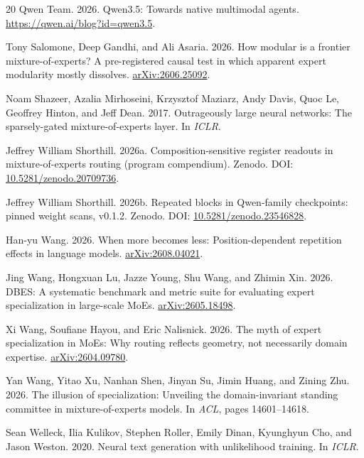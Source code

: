 \documentclass[10pt,a4paper,twocolumn]{article}
\begin{document}
\begin{thebibliography}{20}
Qwen Team. 2026. Qwen3.5: Towards native multimodal agents.
\url{https://qwen.ai/blog?id=qwen3.5}.

Tony Salomone, Deep Gandhi, and Ali Asaria. 2026. How modular is a frontier
mixture-of-experts? A pre-registered causal test in which apparent expert
modularity mostly dissolves. \href{https://arxiv.org/abs/2606.25092}{arXiv:2606.25092}.

Noam Shazeer, Azalia Mirhoseini, Krzysztof Maziarz, Andy Davis, Quoc Le,
Geoffrey Hinton, and Jeff Dean. 2017. Outrageously large neural networks: The
sparsely-gated mixture-of-experts layer. In \emph{ICLR}.

Jeffrey William Shorthill. 2026a. Composition-sensitive register readouts in
mixture-of-experts routing (program compendium). Zenodo.
DOI: \href{https://doi.org/10.5281/zenodo.20709736}{10.5281/zenodo.20709736}.

Jeffrey William Shorthill. 2026b. Repeated blocks in Qwen-family
checkpoints: pinned weight scans, v0.1.2. Zenodo.
DOI: \href{https://doi.org/10.5281/zenodo.23546828}{10.5281/zenodo.23546828}.

Han-yu Wang. 2026. When more becomes less: Position-dependent repetition
effects in language models. \href{https://arxiv.org/abs/2608.04021}{arXiv:2608.04021}.

Jing Wang, Hongxuan Lu, Jazze Young, Shu Wang, and Zhimin Xin. 2026. DBES: A
systematic benchmark and metric suite for evaluating expert specialization in
large-scale MoEs. \href{https://arxiv.org/abs/2605.18498}{arXiv:2605.18498}.

Xi Wang, Soufiane Hayou, and Eric Nalisnick. 2026. The myth of expert
specialization in MoEs: Why routing reflects geometry, not necessarily domain
expertise. \href{https://arxiv.org/abs/2604.09780}{arXiv:2604.09780}.

Yan Wang, Yitao Xu, Nanhan Shen, Jinyan Su, Jimin Huang, and Zining Zhu. 2026.
The illusion of specialization: Unveiling the domain-invariant standing
committee in mixture-of-experts models. In \emph{ACL}, pages 14601--14618.

Sean Welleck, Ilia Kulikov, Stephen Roller, Emily Dinan, Kyunghyun Cho, and
Jason Weston. 2020. Neural text generation with unlikelihood training. In
\emph{ICLR}.


\end{thebibliography}
\end{document}
